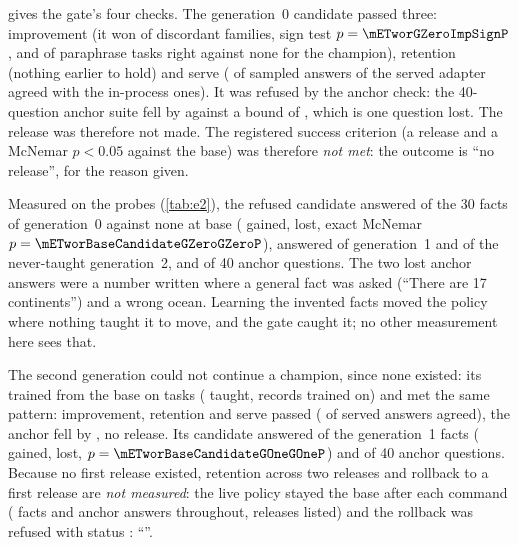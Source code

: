  gives the gate's four checks. The generation~0 candidate passed three: improvement
(it won \mETworGZeroImpSignWins{} of \mETworGZeroImpSignDiscordant{} discordant families, sign test
$p=\mETworGZeroImpSignP$, and \mETworGZeroImpVariantsRight{} of \mETworGZeroImpVariantsN{} paraphrase
tasks right against none for the champion), retention (nothing earlier to hold) and serve
(\mETworGZeroServeAgreed{} of \mETworGZeroServeSampled{} sampled answers of the served adapter
agreed with the in-process ones). It was refused by the anchor check: the 40-question anchor suite
fell by \mETworGZeroAnchorDrop{} against a bound of \mETworGZeroAnchorBound, which is one question
lost. The release was therefore not made. The registered success criterion (a release and a McNemar $p<0.05$ against the base) was therefore
\emph{not met}: the outcome is ``no release'', for the reason given.

Measured on the probes (\cref{tab:e2}), the refused candidate answered \mETworCandidateGZeroGZero{} of
the 30 facts of generation~0 against none at base (\mETworBaseCandidateGZeroGZeroGained{} gained,
\mETworBaseCandidateGZeroGZeroLost{} lost, exact McNemar $p=\mETworBaseCandidateGZeroGZeroP$), answered
\mETworCandidateGZeroGOne{} of generation~1 and \mETworCandidateGZeroGTwo{} of the never-taught generation~2,
and \mETworCandidateGZeroAnchor{} of 40 anchor questions.
The two lost anchor answers were a number written where a general fact was asked (``There are 17
continents'') and a wrong ocean. Learning the invented facts moved the policy where nothing taught
it to move, and the gate caught it; no other measurement here sees that.

The second generation could not continue a champion, since none existed: its  trained from the
base on \mETworGOneTasks{} tasks (\mETworGOneTaught{} taught, \mETworGOneTrainRecords{} records trained on)
and met the same pattern: improvement, retention and serve passed (\mETworGOneServeAgreed{} of
\mETworGOneServeSampled{} served answers agreed), the anchor fell by \mETworGOneAnchorDrop{}, no release.
Its candidate answered \mETworCandidateGOneGOne{} of the generation~1 facts (\mETworBaseCandidateGOneGOneGained{}
gained, \mETworBaseCandidateGOneGOneLost{} lost, $p=\mETworBaseCandidateGOneGOneP$) and \mETworCandidateGOneAnchor{}
of 40 anchor questions. Because no first release existed, retention across two releases and rollback
to a first release are \emph{not measured}: the live policy stayed the base after each command
(\mETworAfterGZeroGZero{} facts and \mETworAfterGOneAnchor{} anchor answers throughout, \mETworReleasesFinal{} releases
listed) and the rollback was refused with status \mETworRollbackExit: ``\mETworRollbackMessage''.

